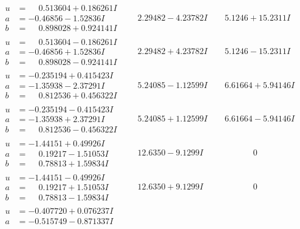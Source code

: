 \documentclass[1p]{elsarticle_modified}
\theoremstyle{definition}
\begin{document}
$$\begin{array}{c|c|c}
 \hline 
\begin{aligned}
u &= \phantom{-}0.513604 + 0.186261 I \\
a &= -0.46856 - 1.52836 I \\
b &= \phantom{-}0.898028 + 0.924141 I\end{aligned}
 & \phantom{-}2.29482 - 4.23782 I & \phantom{-}5.1246 + 15.2311 I \\ \hline\begin{aligned}
u &= \phantom{-}0.513604 - 0.186261 I \\
a &= -0.46856 + 1.52836 I \\
b &= \phantom{-}0.898028 - 0.924141 I\end{aligned}
 & \phantom{-}2.29482 + 4.23782 I & \phantom{-}5.1246 - 15.2311 I \\ \hline\begin{aligned}
u &= -0.235194 + 0.415423 I \\
a &= -1.35938 - 2.37291 I \\
b &= \phantom{-}0.812536 + 0.456322 I\end{aligned}
 & \phantom{-}5.24085 - 1.12599 I & \phantom{-}6.61664 + 5.94146 I \\ \hline\begin{aligned}
u &= -0.235194 - 0.415423 I \\
a &= -1.35938 + 2.37291 I \\
b &= \phantom{-}0.812536 - 0.456322 I\end{aligned}
 & \phantom{-}5.24085 + 1.12599 I & \phantom{-}6.61664 - 5.94146 I \\ \hline\begin{aligned}
u &= -1.44151 + 0.49926 I \\
a &= \phantom{-}0.19217 - 1.51053 I \\
b &= \phantom{-}0.78813 + 1.59834 I\end{aligned}
 & \phantom{-}12.6350 - 9.1299 I & \phantom{-0.000000 } 0 \\ \hline\begin{aligned}
u &= -1.44151 - 0.49926 I \\
a &= \phantom{-}0.19217 + 1.51053 I \\
b &= \phantom{-}0.78813 - 1.59834 I\end{aligned}
 & \phantom{-}12.6350 + 9.1299 I & \phantom{-0.000000 } 0 \\ \hline\begin{aligned}
u &= -0.407720 + 0.076237 I \\
a &= -0.515749 - 0.871337 I \\

\end{aligned}
\end{array}$$
\end{document}
